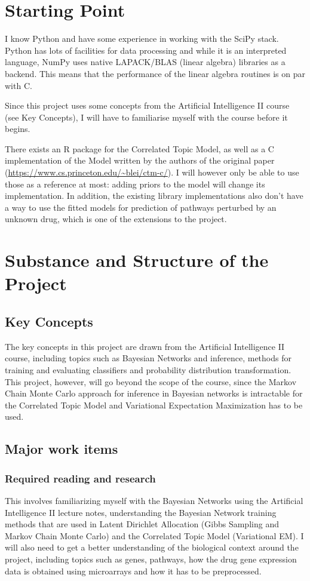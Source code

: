 \documentclass[12pt,a4]{article}
\begin{document}
\section*{Starting Point}

I know Python and have some experience in working with the SciPy stack. Python has lots of facilities for data processing and while it is an interpreted language, NumPy uses native LAPACK/BLAS (linear algebra) libraries as a backend. This means that the performance of the linear algebra routines is on par with C.

Since this project uses some concepts from the Artificial Intelligence II course (see Key Concepts), I will have to familiarise myself with the course before it begins.

There exists an R package for the Correlated Topic Model, as well as a C implementation of the Model written by the authors of the original paper (\url{https://www.cs.princeton.edu/~blei/ctm-c/}). I will however only be able to use those as a reference at most: adding priors to the model will change its implementation. In addition, the existing library implementations also don't have a way to use the fitted models for prediction of pathways perturbed by an unknown drug, which is one of the extensions to the project.

\section*{Substance and Structure of the Project}

\subsection*{Key Concepts}

The key concepts in this project are drawn from the Artificial Intelligence II course, including topics such as Bayesian Networks and inference, methods for training and evaluating classifiers and probability distribution transformation. This project, however, will go beyond the scope of the course, since the Markov Chain Monte Carlo approach for inference in Bayesian networks is intractable for the Correlated Topic Model and Variational Expectation Maximization has to be used.

\subsection*{Major work items}

\subsubsection*{Required reading and research}
This involves familiarizing myself with the Bayesian Networks using the Artificial Intelligence II lecture notes, understanding the Bayesian Network training methods that are used in Latent Dirichlet Allocation (Gibbs Sampling and Markov Chain Monte Carlo) and the Correlated Topic Model (Variational EM). I will also need to get a better understanding of the biological context around the project, including topics such as genes, pathways, how the drug gene expression data is obtained using microarrays and how it has to be preprocessed.
\end{document}
